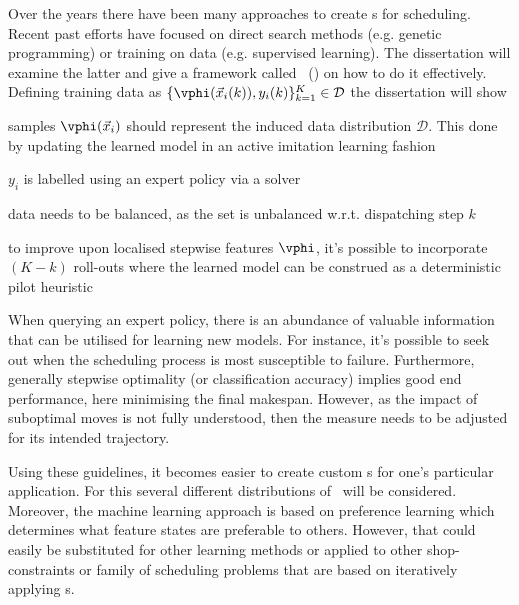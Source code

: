 
Over the years there have been many approaches to create \dr s for scheduling.
Recent past efforts have focused on direct search methods (e.g. genetic 
programming) or training on data (e.g. supervised learning).
The dissertation will examine the latter and give a framework called 
\fullnameAlice\ (\Alice) on how to do it effectively. 
Defining training data as 
\mbox{$\{\vphi(\vec{x}_i(k)),y_i(k)\}_{k=1}^K\in\mathcal{D}$} the dissertation 
will show
\begin{enumerate*}
    \item samples $\vphi(\vec{x}_i)$ should represent the induced data 
    distribution $\mathcal{D}$. This done by updating the learned model in an 
    active imitation learning fashion
    \item $y_i$ is labelled using an expert policy via a solver
    \item data needs to be balanced, as the set is unbalanced w.r.t. 
    dispatching step $k$
    \item to improve upon localised stepwise features $\vphi$, it's possible to 
    incorporate $(K-k)$ roll-outs where the learned model can be construed as a 
    deterministic pilot heuristic
\end{enumerate*}

When querying an expert policy, there is an abundance of valuable information 
that can be utilised for learning new models.
For instance, it's possible to seek out when the scheduling process is most 
susceptible to failure.
Furthermore, generally stepwise optimality (or classification accuracy) 
implies good end performance, here minimising the final makespan. 
However, as the impact of suboptimal moves is not fully understood, then the 
measure needs to be adjusted for its intended trajectory.

Using these guidelines, it becomes easier to create custom \dr s for one's 
particular application. For this several different distributions of \jsp\ 
will be considered.
Moreover, the machine learning approach is based on preference learning 
which determines what feature states are preferable to others. 
However, that could easily be substituted for other learning methods or applied 
to other shop-constraints or family of scheduling problems that are based on 
iteratively applying \dr s.

